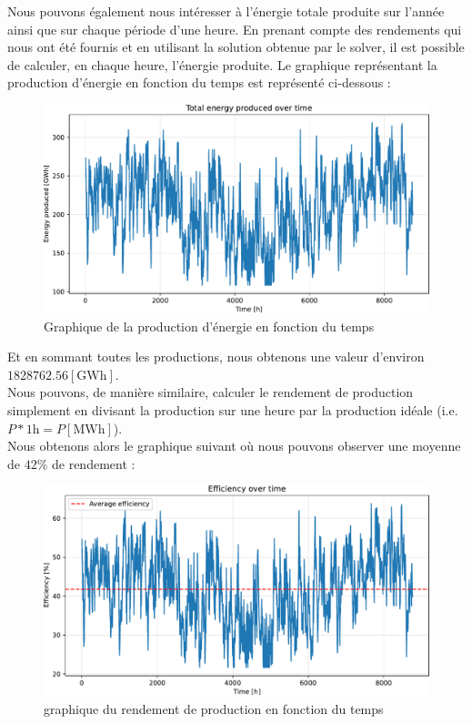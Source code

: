 \documentclass{article}
\newlength{\temp}
\begin{document}
Nous pouvons également nous intéresser à l'énergie totale produite sur l'année ainsi que sur chaque période d'une heure.
En prenant compte des rendements qui nous ont été fournis et en utilisant la solution obtenue par le solver,
il est possible de calculer, en chaque heure, l'énergie produite. Le graphique représentant la production d'énergie en fonction du temps est représenté ci-dessous :

\begin{figure}[h!]
    \centering
    \includegraphics[scale=0.5]{Images/Partie_1/Q1/energy_produced.pdf}
    \caption{Graphique de la production d'énergie en fonction du temps}
    \label{fig:energy_produced_partie1}
\end{figure}
Et en sommant toutes les productions, nous obtenons une valeur d'environ $1828762.56 [\mathrm{GWh}]$.\\
Nous pouvons, de manière similaire, calculer le rendement de production simplement en divisant la production sur une heure par la production idéale (i.e. $P*1\mathrm{h} = P [\mathrm{MWh}]$).\\
Nous obtenons alors le graphique suivant où nous pouvons observer une moyenne de $42\%$ de rendement :

\begin{figure}[h!]
    \centering
    \includegraphics[scale=0.5]{Images/Partie_1/Q1/efficiency.pdf}
    \caption{graphique du rendement de production en fonction du temps}
    \label{fig:efficiency_partie1}
\end{figure}
\newpage
\end{document}
